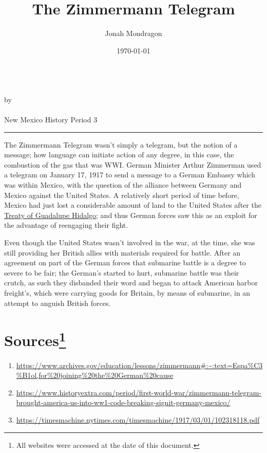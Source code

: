 \documentclass[12pt]{article}
\newcommand{\PutTitle}[1]
{
    \begin{center}
        {\huge\bfseries\thetitle}\\
        by \theauthor\\
        \thedate\\
        #1
    \end{center}
    \hrule
    \vspace{2ex}
}
\begin{document}
\title{The Zimmermann Telegram}
\author{Jonah Mondragon}
\date{\today}
\PutTitle{New Mexico History Period 3}
\pagestyle{headings}
\doublespacing

The Zimmermann Telegram wasn't simply a telegram, but the notion of a message; how language can initiate action of any degree, in this case, the combustion of the gas that was WWI.
German Minister Arthur Zimmerman used a telegram on January 17, 1917 to send a message to a German Embassy which was within Mexico, with the question of the alliance between Germany and Mexico against the United States.
A relatively short period of time before, Mexico had just lost a considerable amount of land to the United States after the
    \href{https://www.ourdocuments.gov/doc.php?flash=false&doc=26}{Treaty of Guadalupe Hidalgo}; and thus German forces saw this as an exploit for the advantage of reengaging their fight.

Even though the United States wasn't involved in the war, at the time, she was still providing her British allies with materials required for battle.
After an agreement on part of the German forces that submarine battle is a degree to severe to be fair; the German's started to hurt, submarine battle was their crutch, as such they disbanded their word and began to attack American harbor freight's, which were carrying goods for Britain, by means of submarine, in an attempt to anguish British forces.

\newpage
\sloppy

\section*{Sources\footnote{All websites were accessed at the date of this document.}}
\begin{enumerate}
    \item{\url{https://www.archives.gov/education/lessons/zimmermann#:~:text=Espa%C3%B1ol,for%20joining%20the%20German%20cause}}
    \item{\url{https://www.historyextra.com/period/first-world-war/zimmermann-telegram-brought-america-us-into-ww1-code-breaking-signit-germany-mexico/}}
    \item{\url{https://timesmachine.nytimes.com/timesmachine/1917/03/01/102318118.pdf}}
\end{enumerate}
\end{document}
